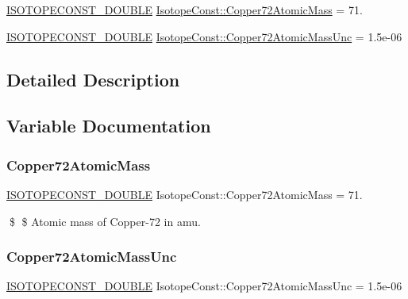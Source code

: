 \begin{DoxyCompactItemize}
\item 
\mbox{\hyperlink{group___isotope_const-_macros_ga8f45a7272ce02c0b4c65c44636ed719a}{I\+S\+O\+T\+O\+P\+E\+C\+O\+N\+S\+T\+\_\+\+D\+O\+U\+B\+LE}} \mbox{\hyperlink{group___isotope_const-_copper-_cu72_ga9e30f6eb415f77fc4e70d10033f24c34}{Isotope\+Const\+::\+Copper72\+Atomic\+Mass}} = 71.
\item 
\mbox{\hyperlink{group___isotope_const-_macros_ga8f45a7272ce02c0b4c65c44636ed719a}{I\+S\+O\+T\+O\+P\+E\+C\+O\+N\+S\+T\+\_\+\+D\+O\+U\+B\+LE}} \mbox{\hyperlink{group___isotope_const-_copper-_cu72_gac73d5b932bc8e51b3fab15795525bcc1}{Isotope\+Const\+::\+Copper72\+Atomic\+Mass\+Unc}} = 1.\+5e-\/06
\end{DoxyCompactItemize}


\subsection{Detailed Description}


\subsection{Variable Documentation}
\mbox{\label{group___isotope_const-_copper-_cu72_ga9e30f6eb415f77fc4e70d10033f24c34}} 
\subsubsection{\texorpdfstring{Copper72\+Atomic\+Mass}{Copper72AtomicMass}}
{\footnotesize\ttfamily \mbox{\hyperlink{group___isotope_const-_macros_ga8f45a7272ce02c0b4c65c44636ed719a}{I\+S\+O\+T\+O\+P\+E\+C\+O\+N\+S\+T\+\_\+\+D\+O\+U\+B\+LE}} Isotope\+Const\+::\+Copper72\+Atomic\+Mass = 71.}

\$ \$ Atomic mass of Copper-\/72 in amu. \mbox{\label{group___isotope_const-_copper-_cu72_gac73d5b932bc8e51b3fab15795525bcc1}} 
\subsubsection{\texorpdfstring{Copper72\+Atomic\+Mass\+Unc}{Copper72AtomicMassUnc}}
{\footnotesize\ttfamily \mbox{\hyperlink{group___isotope_const-_macros_ga8f45a7272ce02c0b4c65c44636ed719a}{I\+S\+O\+T\+O\+P\+E\+C\+O\+N\+S\+T\+\_\+\+D\+O\+U\+B\+LE}} Isotope\+Const\+::\+Copper72\+Atomic\+Mass\+Unc = 1.\+5e-\/06}

